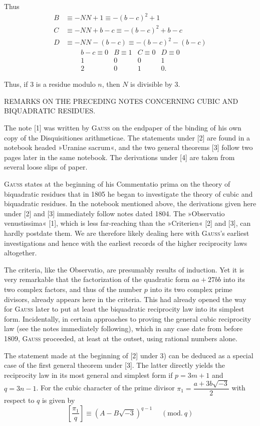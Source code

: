 \noindent\unskip{}Thus
\[\begin{aligned}B&\equiv-NN+1\equiv-(b-c)^2+1\\C&\equiv-NN+b-c\equiv-(b-c)^2+b-c\\D&\equiv-NN-(b-c)\equiv-(b-c)^2-(b-c)\end{aligned}\]
\[\begin{array}{rrrr}
b-c\equiv0&B\equiv1&C\equiv0&D\equiv0\\1&0&0&1\\2&0&1&0.
\end{array}\]
\par\noindent\hspace*{\parindent}Thus, if 3 is a residue modulo $n$, then $N$ is divisible by 3.
\begingroup\small
\begin{center}REMARKS ON THE PRECEDING NOTES CONCERNING CUBIC AND BIQUADRATIC RESIDUES.\end{center}
\noindent\hspace*{\parindent}The note [1] was written by \textsc{Gauss} on the endpaper of the binding of his own copy of the Disquisitiones arithmeticae. The statements under [2] are found in a notebook headed »Uraniae sacrum«, and the two general theorems [3] follow two pages later in the same notebook. The derivations under [4] are taken from several loose slips of paper.

\textsc{Gauss} states at the beginning of his Commentatio prima on the theory of biquadratic residues that in 1805 he began to investigate the theory of cubic and biquadratic residues. In the notebook mentioned above, the derivations given here under [2] and [3] immediately follow notes dated 1804. The »Observatio venustissima« [1], which is less far-reaching than the »Criterien« [2] and [3], can hardly postdate them. We are therefore likely dealing here with \textsc{Gauss}'s earliest investigations and hence with the earliest records of the higher reciprocity laws altogether.

The criteria, like the Observatio, are presumably results of induction. Yet it is very remarkable that the factorization of the quadratic form $aa+27bb$ into its two complex factors, and thus of the number $p$ into its two complex prime divisors, already appears here in the criteria. This had already opened the way for \textsc{Gauss} later to put at least the biquadratic reciprocity law into its simplest form. Incidentally, in certain approaches to proving the general cubic reciprocity law (see the notes immediately following), which in any case date from before 1809, \textsc{Gauss} proceeded, at least at the outset, using rational numbers alone.

The statement made at the beginning of [2] under 3) can be deduced as a special case of the first general theorem under [3]. The latter directly yields the reciprocity law in its most general and simplest form if $p=3m+1$ and $q=3n-1$. For the cubic character of the prime divisor $\pi_1=\dfrac{a+3b\sqrt{-3}}{2}$ with respect to $q$ is given by
\[\left[\frac{\pi_1}{q}\right]\equiv(A-B\sqrt{-3})^{q-1}\quad\;(\mathrm{mod.}\ q)\]
